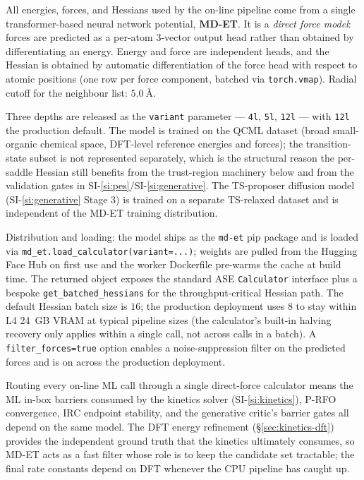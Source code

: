 All energies, forces, and Hessians used by the on-line pipeline come from a single transformer-based neural network potential, \textbf{MD-ET}. It is a \emph{direct force model}: forces are predicted as a per-atom 3-vector output head rather than obtained by differentiating an energy. Energy and force are independent heads, and the Hessian is obtained by automatic differentiation of the force head with respect to atomic positions (one row per force component, batched via \texttt{torch.vmap}). Radial cutoff for the neighbour list: $\SI{5.0}{\angstrom}$.

Three depths are released as the \texttt{variant} parameter --- \texttt{4l}, \texttt{5l}, \texttt{12l} --- with \texttt{12l} the production default. The model is trained on the QCML dataset (broad small-organic chemical space, DFT-level reference energies and forces); the transition-state subset is not represented separately, which is the structural reason the per-saddle Hessian still benefits from the trust-region machinery below and from the validation gates in SI-\ref{si:pes}/SI-\ref{si:generative}. The TS-proposer diffusion model (SI-\ref{si:generative} Stage 3) is trained on a separate TS-relaxed dataset and is independent of the MD-ET training distribution.

Distribution and loading: the model ships as the \texttt{md-et} pip package and is loaded via \texttt{md\_et.load\_calculator(variant=...)}; weights are pulled from the Hugging Face Hub on first use and the worker Dockerfile pre-warms the cache at build time. The returned object exposes the standard ASE \texttt{Calculator} interface plus a bespoke \texttt{get\_batched\_hessians} for the throughput-critical Hessian path. The default Hessian batch size is $16$; the production deployment uses $8$ to stay within L4 24~GB VRAM at typical pipeline sizes (the calculator's built-in halving recovery only applies within a single call, not across calls in a batch). A \texttt{filter\_forces=true} option enables a noise-suppression filter on the predicted forces and is on across the production deployment.

Routing every on-line ML call through a single direct-force calculator means the ML in-box barriers consumed by the kinetics solver (SI-\ref{si:kinetics}), P-RFO convergence, IRC endpoint stability, and the generative critic's barrier gates all depend on the same model. The DFT energy refinement (\S\ref{sec:kinetics-dft}) provides the independent ground truth that the kinetics ultimately consumes, so MD-ET acts as a fast filter whose role is to keep the candidate set tractable; the final rate constants depend on DFT whenever the CPU pipeline has caught up.


